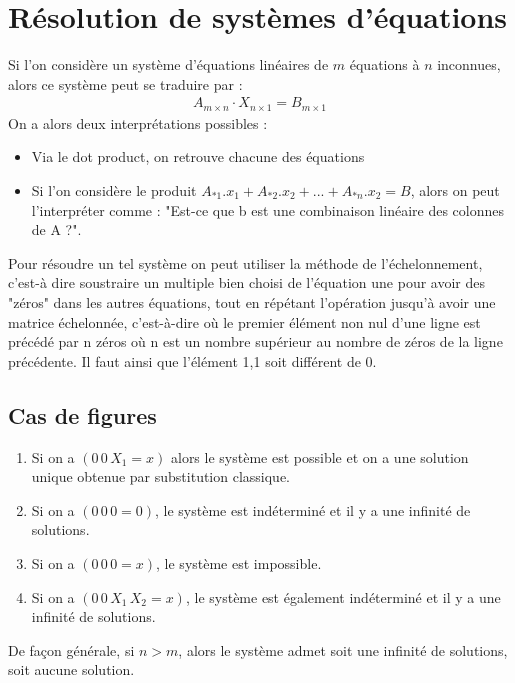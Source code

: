 \documentclass[a4paper]{book}
\begin{document}
\section{Résolution de systèmes d'équations}
Si l'on considère un système d'équations linéaires de $m$ équations à $n$ inconnues, alors ce système peut se traduire par :
\begin{gather}
    A_{m\times n} \cdot X_{n\times 1} = B_{m\times 1}
\end{gather}
On a alors deux interprétations possibles :
\begin{itemize}
    \item Via le dot product, on retrouve chacune des équations
    \item Si l'on considère le produit $A_{*1}.x_1 + A_{*2}.x_2 + ... + A_{*n}.x_2 = B$, alors on peut l'interpréter comme : "Est-ce que b est une combinaison linéaire des colonnes de A ?".
\end{itemize}
Pour résoudre un tel système on peut utiliser la méthode de l'échelonnement, c'est-à dire soustraire un multiple bien choisi de l'équation une pour avoir des "zéros" dans les autres équations, tout en répétant l'opération jusqu'à avoir une matrice échelonnée, c'est-à-dire où le premier élément non nul d'une ligne est précédé par n zéros où n est un nombre supérieur au nombre de zéros de la ligne précédente. Il faut ainsi que l'élément 1,1 soit différent de 0.
\subsection{Cas de figures}
\begin{enumerate}
    \item Si on a $(0\, 0\, X_1 = x)$ alors le système est possible et on a une solution unique obtenue par substitution classique.
    \item Si on a $(0\, 0\, 0 = 0)$, le système est indéterminé et il y a une infinité de solutions.
    \item Si on a $(0\, 0\, 0 = x)$, le système est impossible.
    \item Si on a $(0\, 0\, X_1\, X_2 = x)$, le système est également indéterminé et il y a une infinité de solutions.
\end{enumerate}
\begin{framed}
De façon générale, si $n > m$, alors le système admet soit une infinité de solutions, soit aucune solution.
\end{framed}
\end{document}
